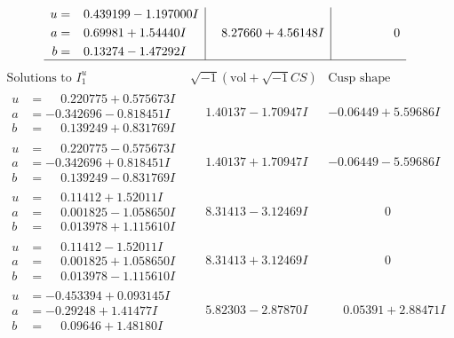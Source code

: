 \documentclass[1p]{elsarticle_modified}
\theoremstyle{definition}
\newcommand{\I}{\sqrt{-1}}
\begin{document}
$$\begin{array}{c|c|c}
\begin{aligned}
u &= \phantom{-}0.439199 - 1.197000 I \\
a &= \phantom{-}0.69981 + 1.54440 I \\
b &= \phantom{-}0.13274 - 1.47292 I\end{aligned}
 & \phantom{-}8.27660 + 4.56148 I & \phantom{-0.000000 } 0\\
 \hline 
 \end{array}$$\newpage$$\begin{array}{c|c|c}  
\text{Solutions to }I^u_{1}& \I (\text{vol} + \sqrt{-1}CS) & \text{Cusp shape}\\
 \hline 
\begin{aligned}
u &= \phantom{-}0.220775 + 0.575673 I \\
a &= -0.342696 - 0.818451 I \\
b &= \phantom{-}0.139249 + 0.831769 I\end{aligned}
 & \phantom{-}1.40137 - 1.70947 I & -0.06449 + 5.59686 I \\ \hline\begin{aligned}
u &= \phantom{-}0.220775 - 0.575673 I \\
a &= -0.342696 + 0.818451 I \\
b &= \phantom{-}0.139249 - 0.831769 I\end{aligned}
 & \phantom{-}1.40137 + 1.70947 I & -0.06449 - 5.59686 I \\ \hline\begin{aligned}
u &= \phantom{-}0.11412 + 1.52011 I \\
a &= \phantom{-}0.001825 - 1.058650 I \\
b &= \phantom{-}0.013978 + 1.115610 I\end{aligned}
 & \phantom{-}8.31413 - 3.12469 I & \phantom{-0.000000 } 0 \\ \hline\begin{aligned}
u &= \phantom{-}0.11412 - 1.52011 I \\
a &= \phantom{-}0.001825 + 1.058650 I \\
b &= \phantom{-}0.013978 - 1.115610 I\end{aligned}
 & \phantom{-}8.31413 + 3.12469 I & \phantom{-0.000000 } 0 \\ \hline\begin{aligned}
u &= -0.453394 + 0.093145 I \\
a &= -0.29248 + 1.41477 I \\
b &= \phantom{-}0.09646 + 1.48180 I\end{aligned}
 & \phantom{-}5.82303 - 2.87870 I & \phantom{-}0.05391 + 2.88471 I \\ \hline\begin{aligned}

\end{aligned}
\end{array}$$
\end{document}
